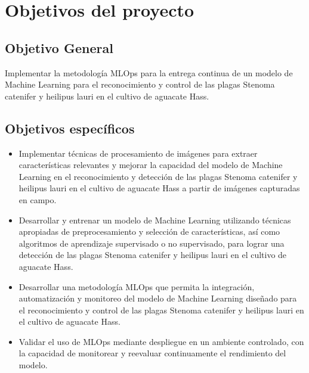 \section{Objetivos del proyecto}

\subsection{Objetivo General}
Implementar la metodología MLOps para la entrega continua de un modelo de Machine Learning para el reconocimiento y control de las plagas Stenoma catenifer y heilipus lauri en el cultivo de aguacate Hass.




\subsection{Objetivos específicos}
\begin{itemize}
  \item Implementar técnicas de procesamiento de imágenes para extraer características relevantes y mejorar la capacidad del modelo de Machine Learning en el reconocimiento y detección de las plagas Stenoma catenifer y heilipus lauri en el cultivo de aguacate Hass a partir de imágenes capturadas en campo.
  \item Desarrollar y entrenar un modelo de Machine Learning utilizando técnicas apropiadas de preprocesamiento y selección de características, así como algoritmos de aprendizaje supervisado o no supervisado, para lograr una detección de las plagas Stenoma catenifer y heilipus lauri en el cultivo de aguacate Hass.
  \item Desarrollar una metodología MLOps que permita la integración, automatización y monitoreo del modelo de Machine Learning diseñado para el reconocimiento y control de las plagas Stenoma catenifer y heilipus lauri en el cultivo de aguacate Hass.
  \item Validar el uso de MLOps mediante despliegue en un ambiente controlado, con la capacidad de monitorear y reevaluar continuamente el rendimiento del modelo.  
\end{itemize}

\newpage
